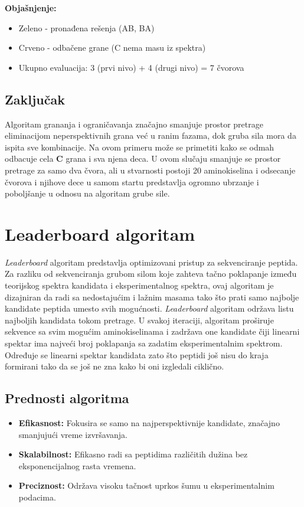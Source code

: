 \documentclass[12pt,oneside]{memoir}
\begin{document}
\textbf{Objašnjenje:}
\begin{itemize}
    \item \textcolor{green!50!black}{Zeleno} - pronađena rešenja (AB, BA)
    \item \textcolor{red!50!black}{Crveno} - odbačene grane (C nema masu iz spektra)
    \item Ukupno evaluacija: 3 (prvi nivo) + 4 (drugi nivo) = 7 čvorova
\end{itemize}

\subsection{Zaključak}

Algoritam grananja i ograničavanja značajno smanjuje prostor pretrage eliminacijom neperspektivnih grana već u ranim fazama, dok gruba sila mora da ispita sve kombinacije.
Na ovom primeru može se primetiti kako se odmah odbacuje cela \textbf{C} grana i sva njena deca. U ovom slučaju smanjuje se prostor pretrage za samo dva čvora, ali u stvarnosti postoji 20 aminokiselina i odsecanje čvorova i njihove dece u samom startu predstavlja ogromno ubrzanje i poboljšanje u odnosu na algoritam grube sile.

\section{Leaderboard algoritam}
\emph{Leaderboard} algoritam \cite{online_lecture, online_book} predstavlja optimizovani pristup za sekvenciranje peptida. Za razliku od sekvenciranja grubom silom koje zahteva tačno poklapanje između teorijskog spektra kandidata i eksperimentalnog spektra, ovaj algoritam je dizajniran da radi sa nedostajućim i lažnim masama tako što prati samo najbolje kandidate peptida umesto svih mogućnosti.
\emph{Leaderboard} algoritam održava listu najboljih kandidata tokom pretrage. U svakoj iteraciji, algoritam proširuje sekvence sa svim mogućim aminokiselinama i zadržava one kandidate čiji linearni spektar ima najveći broj poklapanja sa zadatim eksperimentalnim spektrom.
Određuje se linearni spektar kandidata zato što peptidi još nisu do kraja formirani tako da se još ne zna kako bi oni izgledali ciklično.

\subsection{Prednosti algoritma}

\begin{itemize}
    \item \textbf{Efikasnost:} Fokusira se samo na najperspektivnije kandidate, značajno smanjujući vreme izvršavanja.
    \item \textbf{Skalabilnost:} Efikasno radi sa peptidima različitih dužina bez eksponencijalnog rasta vremena.
    \item \textbf{Preciznost:} Održava visoku tačnost uprkos šumu u eksperimentalnim podacima.
\end{itemize}
\end{document}
